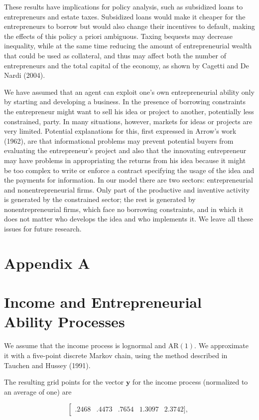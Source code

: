 \documentclass[10pt]{article}
\begin{document}
These results have implications for policy analysis, such as subsidized loans to entrepreneurs and estate taxes. Subsidized loans would make it cheaper for the entrepreneurs to borrow but would also change their incentives to default, making the effects of this policy a priori ambiguous. Taxing bequests may decrease inequality, while at the same time reducing the amount of entrepreneurial wealth that could be used as collateral, and thus may affect both the number of entrepreneurs and the total capital of the economy, as shown by Cagetti and De Nardi (2004).

We have assumed that an agent can exploit one's own entrepreneurial ability only by starting and developing a business. In the presence of borrowing constraints the entrepreneur might want to sell his idea or project to another, potentially less constrained, party. In many situations, however, markets for ideas or projects are very limited. Potential explanations for this, first expressed in Arrow's work (1962), are that informational problems may prevent potential buyers from evaluating the entrepreneur's project and also that the innovating entrepreneur may have problems in appropriating the returns from his idea because it might be too complex to write or enforce a contract specifying the usage of the idea and the payments for information. In our model there are two sectors: entrepreneurial and nonentrepreneurial firms. Only part of the productive and inventive activity is generated by the constrained sector; the rest is generated by nonentrepreneurial firms, which face no borrowing constraints, and in which it does not matter who develops the idea and who implements it. We leave all these issues for future research.

\section*{Appendix A}
\section*{Income and Entrepreneurial Ability Processes}
We assume that the income process is lognormal and $\mathrm{AR}(1)$. We approximate it with a five-point discrete Markov chain, using the method described in Tauchen and Hussey (1991).

The resulting grid points for the vector $\boldsymbol{y}$ for the income process (normalized to an average of one) are

$$
\left[\begin{array}{lllll}
.2468 & .4473 & .7654 & 1.3097 & 2.3742],
\end{array}\right.
$$
\end{document}
